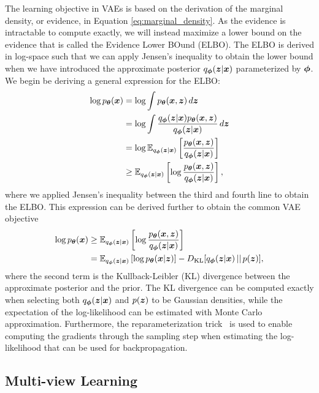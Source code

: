 The learning objective in VAEs is based on the derivation of the marginal density, or evidence, in Equation \ref{eq:marginal_density}. As the evidence is intractable to compute exactly, we will instead maximize a lower bound on the evidence that is called the Evidence Lower BOund (ELBO). The ELBO is derived in log-space such that we can apply Jensen's inequality to obtain the lower bound when we have introduced the approximate posterior $q_{{\bm{\phi}}}({\bm{z}} | {\bm{x}})$ parameterized by ${\bm{\phi}}$. We begin be deriving a general expression for the ELBO: 
\begin{align}\label{eq:elbo}
	\begin{split}
		\log p_{{\bm{\theta}}}({\bm{x}}) & = \log \int p_{{\bm{\theta}}}({\bm{x}}, {\bm{z}}) \,d{\bm{z}} \\ 
		& = \log \int \frac{q_{{\bm{\phi}}}({\bm{z}} | {\bm{x}}) p_{{\bm{\theta}}}({\bm{x}} , {\bm{z}})}{q_{{\bm{\phi}}}({\bm{z}} | {\bm{x}})} \,d{\bm{z}} \\
		& = \log \mathbb{E}_{q_{{\bm{\phi}}}({\bm{z}} | {\bm{x}})}\left[ \frac{p_{{\bm{\theta}}}({\bm{x}} , {\bm{z}})}{q_{{\bm{\phi}}}({\bm{z}} | {\bm{x}})}\right] \\
		& \geq \mathbb{E}_{q_{{\bm{\phi}}}({\bm{z}} | {\bm{x}})}\left[ \log \frac{p_{{\bm{\theta}}}({\bm{x}} , {\bm{z}})}{q_{{\bm{\phi}}}({\bm{z}} | {\bm{x}})}\right] ,
	\end{split}
\end{align}
where we applied Jensen's inequality between the third and fourth line to obtain the ELBO. This expression can be derived further to obtain the common VAE objective
\begin{align}\label{eq:vae}
	\begin{split}
		\log p_{{\bm{\theta}}}({\bm{x}}) & \geq \mathbb{E}_{q_{{\bm{\phi}}}({\bm{z}} | {\bm{x}})}\left[ \log \frac{p_{{\bm{\theta}}}({\bm{x}} , {\bm{z}})}{q_{{\bm{\phi}}}({\bm{z}} | {\bm{x}})}\right] \\
		& = \mathbb{E}_{q_{{\bm{\phi}}}({\bm{z}} | {\bm{x}})}\left[ \log p_{{\bm{\theta}}}({\bm{x}} | {\bm{z}}) \right] - D_{\mathrm{KL}}[q_{{\bm{\phi}}}({\bm{z}} | {\bm{x}}) \,||\, p({\bm{z}})], 
	\end{split}
\end{align}
where the second term is the Kullback-Leibler (KL) divergence between the approximate posterior and the prior. The KL divergence can be computed exactly when selecting both $q_{{\bm{\phi}}}({\bm{z}} | {\bm{x}})$ and $p({\bm{z}})$ to be Gaussian densities, while the expectation of the log-likelihood can be estimated with Monte Carlo approximation. Furthermore, the reparameterization trick~\cite{kingma2013auto, rezende2014stochastic} is used to enable computing the gradients through the sampling step when estimating the log-likelihood that can be used for backpropagation. 


\subsection{Multi-view Learning}


